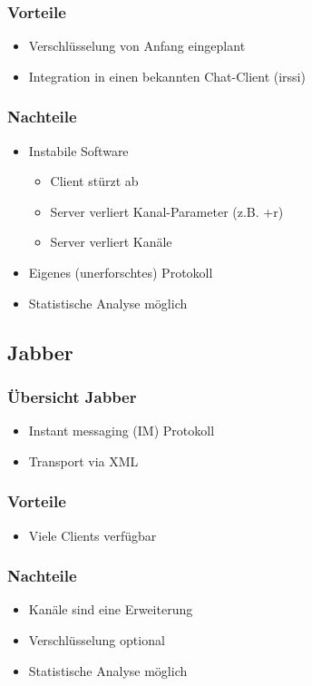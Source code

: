 \documentclass{beamer}
\begin{document}
\frame
{
  \frametitle{Vorteile}

  \begin{itemize}
  \item Verschl\"usselung von Anfang eingeplant
  \pause
  \item Integration in einen bekannten Chat-Client (irssi)
  \end{itemize}
}

\frame
{
  \frametitle{Nachteile}

  \begin{itemize}
  \item Instabile Software
  \pause
  \begin{itemize}
  \item Client st\"urzt ab
  \pause
  \item Server verliert Kanal-Parameter (z.B. +r)
  \pause
  \item Server verliert Kan\"ale
  \pause
  \end{itemize}
  \item Eigenes (unerforschtes) Protokoll
  \pause
  \item Statistische Analyse m\"oglich
  \end{itemize}
}

\subsection{Jabber}
\frame
{
  \frametitle{\"Ubersicht Jabber}

  \begin{itemize}
  \item Instant messaging (IM) Protokoll
  \pause
  \item Transport via XML
  \end{itemize}
}

\frame
{
  \frametitle{Vorteile}

  \begin{itemize}
  \item Viele Clients verf\"ugbar
  \end{itemize}
}

\frame
{
  \frametitle{Nachteile}

  \begin{itemize}
  \item Kan\"ale sind eine Erweiterung
  \pause
  \item Verschl\"usselung optional
  \pause
  \item Statistische Analyse m\"oglich
  \end{itemize}
}
\end{document}
